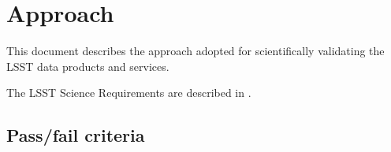 \section{Approach} \label{sec:approach}

This document describes the approach adopted for scientifically validating the \gls{LSST} data products and services. 

The \gls{LSST} Science Requirements  are described in .


\subsection{Pass/fail criteria}
\label{sec:passfail}
